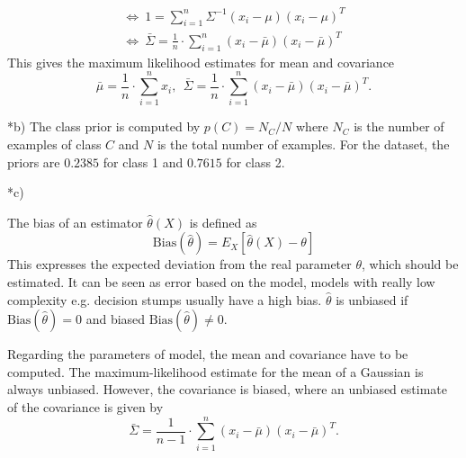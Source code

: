 \documentclass[12pt]{article}
\begin{document}
\begin{section}
\begin{subsection}
\begin{gather*}
		\Leftrightarrow~ 1 = \sum_{i=1}^n \Sigma^{-1}(x_i-\mu)(x_i-\mu)^T\\
		\Leftrightarrow~ \bar{\Sigma} = \frac{1}{n}\cdot\sum_{i=1}^n (x_i-\bar{\mu})(x_i-\bar{\mu})^T
		\end{gather*}
		This gives the maximum likelihood estimates for mean and covariance
		\begin{equation*}
		\bar{\mu} =\frac{1}{n} \cdot \sum_{i=1}^n x_i,~~\bar{\Sigma} = \frac{1}{n}\cdot\sum_{i=1}^n (x_i-\bar{\mu})(x_i-\bar{\mu})^T.
		\end{equation*}
	\end{subsection}
	\begin{subsection}*{b)}
		The class prior is computed by $p(C)=N_C/N$ where $N_C$ is the number of examples of class $C$ and $N$ is the total number of examples.
		For the dataset, the priors are $0.2385$ for class 1 and $0.7615$ for class 2.
	\end{subsection}
	\begin{subsection}*{c)}
		
		The bias of an estimator $\hat{\theta}(X)$ is defined as
		\begin{equation*}
		\text{Bias}(\hat{\theta}) = E_X[\hat{\theta}(X) -\theta]
		\end{equation*}
		This expresses the expected deviation from the real parameter $\theta$, which should be estimated. 
		It can be seen as error based on the model, models with really low complexity e.g. decision stumps usually have a high bias.
		$\hat{\theta}$ is unbiased if $\text{Bias}(\hat{\theta})=0$ and biased $\text{Bias}(\hat{\theta})\neq0$.
		
		Regarding the parameters of model, the mean and covariance have to be computed. 
		The maximum-likelihood estimate for the mean of a Gaussian is always unbiased.
		However, the covariance is biased, where an unbiased estimate of the covariance is given by
		\begin{equation*}
		\bar{\Sigma} = \frac{1}{n-1}\cdot\sum_{i=1}^n (x_i-\bar{\mu})(x_i-\bar{\mu})^T.
		\end{equation*}
		

\end{subsection}
\end{section}
\end{document}
